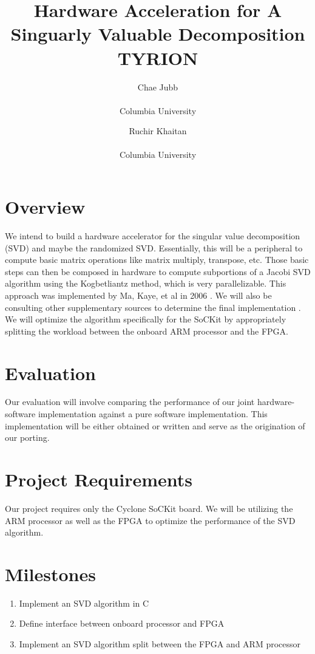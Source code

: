 \documentclass[twocolumn]{article}
\title{Hardware Acceleration for A Singuarly Valuable Decomposition \\ TYRION}
\author{
	Chae Jubb \\ \ttt{ecj2122@columbia.edu} \\ Columbia University
	\and
	Ruchir Khaitan \\ \ttt{rk2660@columbia.edu} \\ Columbia University
}
\date{}
\begin{document}
\maketitle

\section*{Overview}
We intend to build a hardware accelerator for the singular value decomposition
(SVD) and maybe the randomized SVD. Essentially, this will be a peripheral to
compute basic matrix operations like matrix multiply, transpose, etc. Those
basic steps can then be composed in hardware to compute subportions of a Jacobi
SVD algorithm using the Kogbetliantz method, which is very parallelizable. This
approach was implemented by Ma, Kaye, et al in 2006 \cite{FPGA_SVD_ma}.  We will
also be consulting other supplementary sources to determine the final
implementation \cite{berry2006parallel, halko2011finding}.  We will optimize the
algorithm specifically for the SoCKit by appropriately splitting the workload
between the onboard ARM processor and the FPGA.

\section*{Evaluation}
Our evaluation will involve comparing the performance of our joint
hardware-software implementation against a pure software implementation.  This
implementation will be either obtained or written and serve as the origination
of our porting.

\section*{Project Requirements}
Our project requires only the Cyclone SoCKit board.  We will be utilizing the
ARM processor as well as the FPGA to optimize the performance of the SVD
algorithm.

\section*{Milestones}
\begin{enumerate}
	\item Implement an SVD algorithm in C
	\item Define interface between onboard processor and FPGA
	\item Implement an SVD algorithm split between the FPGA and ARM processor
\end{enumerate}

{\small


}
\end{document}
